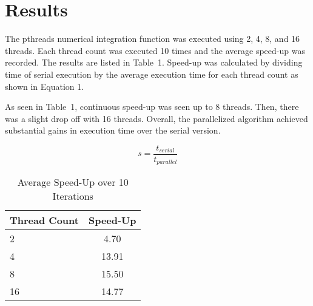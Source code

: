 \documentclass[12pt]{article}
\begin{document}
\pagebreak
\vspace{-0.6cm}
\section{Results}
\vspace{-0.4cm}
\qquad The pthreads numerical integration function was executed using 2, 4, 8, and 16 threads. Each thread count was executed 10 times and
the average speed-up was recorded. The results are listed in 
Table~1. Speed-up was calculated by dividing time of 
serial execution by the average execution time for each thread count
as shown in Equation 1.

As seen in Table~1, continuous speed-up was seen 
up to 8 threads. Then, there was a slight drop off with 16 threads.
Overall, the parallelized algorithm achieved substantial gains
in execution time over the serial version. 

\begin{equation}
    s = \frac{t_{serial}}{t_{parallel}}
\end{equation}

\begin{table}[H]
    \centering
\begin{tabular}{@{}|l|c|}
\hline
Thread Count & Speed-Up \\ \hline
2  & 4.70  \\ \hline 
4  & 13.91 \\ \hline 
8  & 15.50 \\ \hline 
16 & 14.77 \\ \hline 
\end{tabular}
\caption{Average Speed-Up over 10 Iterations}
\end{table}

\end{document}
